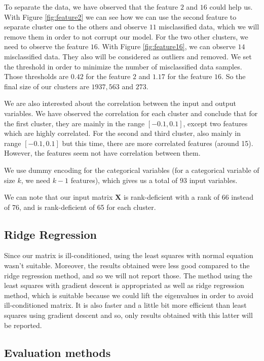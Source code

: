 \documentclass{article} %
\begin{document}
To separate the data, we have observed that the feature $2$ and $16$ could help us. With Figure \ref{fig:feature2} we can see how we can use the second feature to separate cluster one to the others and observe $11$ misclassified data, which we will remove them in order to not corrupt our model. For the two other clusters, we need to observe the feature $16$. With Figure \ref{fig:feature16}, we can observe $14$ misclassified data. They also will be considered as outliers and removed. We set the threshold in order to minimize the number of misclassified data samples. Those thresholds are $0.42$ for the feature $2$ and $1.17$ for the feature $16$. So the final size of our clusters are $1937, 563$ and $273$.

We are also interested about the correlation between the input and output variables. We have observed the correlation for each cluster and conclude that for the first cluster, they are mainly in the range $[-0.1,0.1]$, except two features which are highly correlated. For the second and third cluster, also mainly in range $[-0.1,0.1]$ but this time, there are more correlated features (around 15). However, the features seem not have correlation between them.

We use dummy encoding for the categorical variables (for a categorical variable of size $k$, we need $k-1$ features), which gives us a total of $93$ input variables.

We can note that our input matrix $\mathbf{X}$ is rank-deficient with a rank of 66 instead of 76, and is rank-deficient of 65 for each cluster.
\vspace{-0.5em}
\subsection{Ridge Regression}

Since our matrix is ill-conditioned, using the least squares with normal equation wasn't suitable. Moreover, the results obtained were less good compared to the ridge regression method, and so we will not report those. The method using the least squares with gradient descent is appropriated as well as ridge regression method, which is suitable because we could lift the eigenvalues in order to avoid ill-conditioned matrix. It is also faster and a little bit more efficient than least squares using gradient descent and so, only results obtained with this latter will be reported.
\vspace{-0.5em}
\subsection{Evaluation methods}
\end{document}
